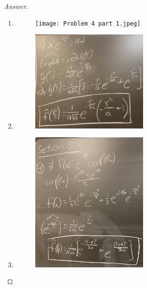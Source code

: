 \documentclass{article}
\theoremstyle{definition}
\renewcommand\qedsymbol{$\blacksquare$}
\newenvironment{ans}{\begin{proof}[Answer]\renewcommand{\qedsymbol}{}}{\end{proof}}
\begin{document}
\begin{ans}
    \begin{enumerate}
        \item \phantom{.}
        \begin{figure}[H]
            \centering
            \texttt{[image: Problem 4 part 1.jpeg]}
        \end{figure}

        \item \phantom{.}
        \begin{figure}[H]
            \centering
            \includegraphics[width = 0.55\textwidth]{Problem 4 Part 2.jpeg}
        \end{figure}

        \item \phantom{.}
        \begin{figure}[H]
            \centering
            \includegraphics[width = 0.55\textwidth]{Problem 4 part 3.jpeg}
        \end{figure}


\end{enumerate}
\end{ans}
\end{document}
